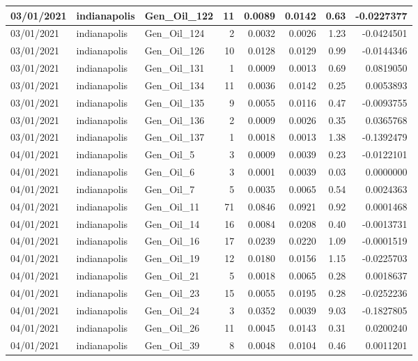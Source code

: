 \documentclass[
  letterpaper,
  DIV=11,
  numbers=noendperiod]{scrartcl}
\begin{document}
\begin{tabular}{l|l|l|r|r|r|r|r}
\hline
03/01/2021 & indianapolis & Gen\_Oil\_122 & 11 & 0.0089 & 0.0142 & 0.63 & -0.0227377\\
\hline
03/01/2021 & indianapolis & Gen\_Oil\_124 & 2 & 0.0032 & 0.0026 & 1.23 & -0.0424501\\
\hline
03/01/2021 & indianapolis & Gen\_Oil\_126 & 10 & 0.0128 & 0.0129 & 0.99 & -0.0144346\\
\hline
03/01/2021 & indianapolis & Gen\_Oil\_131 & 1 & 0.0009 & 0.0013 & 0.69 & 0.0819050\\
\hline
03/01/2021 & indianapolis & Gen\_Oil\_134 & 11 & 0.0036 & 0.0142 & 0.25 & 0.0053893\\
\hline
03/01/2021 & indianapolis & Gen\_Oil\_135 & 9 & 0.0055 & 0.0116 & 0.47 & -0.0093755\\
\hline
03/01/2021 & indianapolis & Gen\_Oil\_136 & 2 & 0.0009 & 0.0026 & 0.35 & 0.0365768\\
\hline
03/01/2021 & indianapolis & Gen\_Oil\_137 & 1 & 0.0018 & 0.0013 & 1.38 & -0.1392479\\
\hline
04/01/2021 & indianapolis & Gen\_Oil\_5 & 3 & 0.0009 & 0.0039 & 0.23 & -0.0122101\\
\hline
04/01/2021 & indianapolis & Gen\_Oil\_6 & 3 & 0.0001 & 0.0039 & 0.03 & 0.0000000\\
\hline
04/01/2021 & indianapolis & Gen\_Oil\_7 & 5 & 0.0035 & 0.0065 & 0.54 & 0.0024363\\
\hline
04/01/2021 & indianapolis & Gen\_Oil\_11 & 71 & 0.0846 & 0.0921 & 0.92 & 0.0001468\\
\hline
04/01/2021 & indianapolis & Gen\_Oil\_14 & 16 & 0.0084 & 0.0208 & 0.40 & -0.0013731\\
\hline
04/01/2021 & indianapolis & Gen\_Oil\_16 & 17 & 0.0239 & 0.0220 & 1.09 & -0.0001519\\
\hline
04/01/2021 & indianapolis & Gen\_Oil\_19 & 12 & 0.0180 & 0.0156 & 1.15 & -0.0225703\\
\hline
04/01/2021 & indianapolis & Gen\_Oil\_21 & 5 & 0.0018 & 0.0065 & 0.28 & 0.0018637\\
\hline
04/01/2021 & indianapolis & Gen\_Oil\_23 & 15 & 0.0055 & 0.0195 & 0.28 & -0.0252236\\
\hline
04/01/2021 & indianapolis & Gen\_Oil\_24 & 3 & 0.0352 & 0.0039 & 9.03 & -0.1827805\\
\hline
04/01/2021 & indianapolis & Gen\_Oil\_26 & 11 & 0.0045 & 0.0143 & 0.31 & 0.0200240\\
\hline
04/01/2021 & indianapolis & Gen\_Oil\_39 & 8 & 0.0048 & 0.0104 & 0.46 & 0.0011201\\

\end{tabular}
\end{document}

